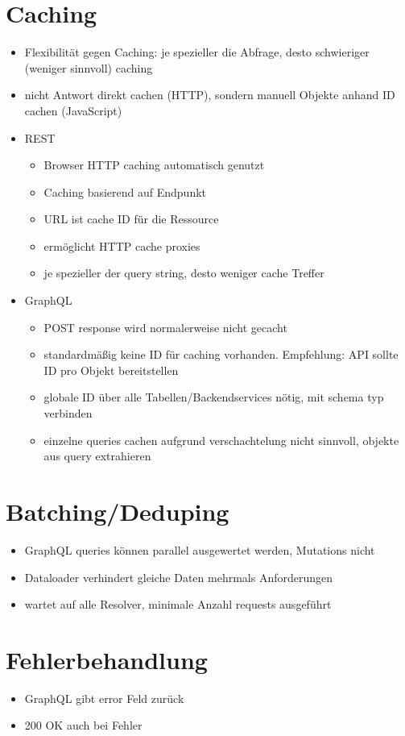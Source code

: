 \section{Caching}
\begin{itemize}
  \item Flexibilität gegen Caching: je spezieller die Abfrage, desto schwieriger (weniger sinnvoll) caching
  \item nicht Antwort direkt cachen (HTTP), sondern manuell Objekte anhand ID cachen (JavaScript)
  \item REST
  \begin{itemize}
    \item Browser HTTP caching automatisch genutzt
    \item Caching basierend auf Endpunkt
    \item URL ist cache ID für die Ressource
    \item ermöglicht HTTP cache proxies
    \item je spezieller der query string, desto weniger cache Treffer
  \end{itemize}
  \item GraphQL
  \begin{itemize}
    \item POST response wird normalerweise nicht gecacht
    \item standardmäßig keine ID für caching vorhanden. Empfehlung: API sollte ID pro Objekt bereitstellen
    \item globale ID über alle Tabellen/Backendservices nötig, mit schema typ verbinden
    \item einzelne queries cachen aufgrund verschachtelung nicht sinnvoll, objekte aus query extrahieren
  \end{itemize}
\end{itemize}

\section{Batching/Deduping}
\begin{itemize}
  \item GraphQL queries können parallel ausgewertet werden, Mutations nicht
  \item Dataloader verhindert gleiche Daten mehrmals Anforderungen
  \item wartet auf alle Resolver, minimale Anzahl requests ausgeführt
\end{itemize}

\section{Fehlerbehandlung}
\begin{itemize}
  \item GraphQL gibt error Feld zurück
  \item 200 OK auch bei Fehler
\end{itemize}

